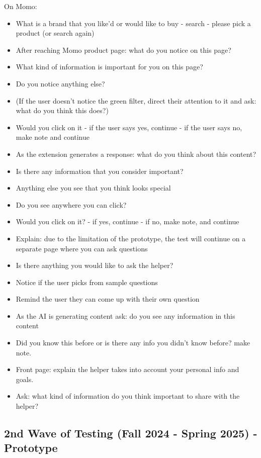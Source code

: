 \documentclass[
  12pt,
  letterpaper,
  DIV=11,
  numbers=noendperiod]{scrartcl}
\providecommand{\tightlist}{%
  \setlength{\itemsep}{0pt}\setlength{\parskip}{0pt}}
\begin{document}
On Momo:

\begin{itemize}
\tightlist
\item
  What is a brand that you like'd or would like to buy - search - please
  pick a product (or search again)
\item
  After reaching Momo product page: what do you notice on this page?
\item
  What kind of information is important for you on this page?
\item
  Do you notice anything else?
\item
  (If the user doesn't notice the green filter, direct their attention
  to it and ask: what do you think this does?)
\item
  Would you click on it - if the user says yes, continue - if the user
  says no, make note and continue
\item
  As the extension generates a response: what do you think about this
  content?
\item
  Is there any information that you consider important?
\item
  Anything else you see that you think looks special
\item
  Do you see anywhere you can click?
\item
  Would you click on it? - if yes, continue - if no, make note, and
  continue
\item
  Explain: due to the limitation of the prototype, the test will
  continue on a separate page where you can ask questions
\item
  Is there anything you would like to ask the helper?
\item
  Notice if the user picks from sample questions
\item
  Remind the user they can come up with their own question
\item
  As the AI is generating content ask: do you see any information in
  this content
\item
  Did you know this before or is there any info you didn't know before?
  make note.
\item
  Front page: explain the helper takes into account your personal info
  and goals.
\item
  Ask: what kind of information do you think important to share with the
  helper?
\end{itemize}

\subsection{2nd Wave of Testing (Fall 2024 - Spring 2025) -
Prototype}\label{nd-wave-of-testing-fall-2024---spring-2025---prototype}
\end{document}
